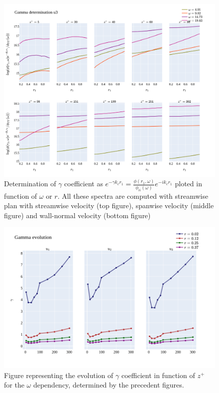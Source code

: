 \documentclass[]{article}
\theoremstyle{plain}
\theoremstyle{remark}
\begin{document}
\begin{figure}[H]
	\begin{center}
		\includegraphics[width=\textwidth]{../../output/figures/channel_wrles_retau395/split_time/gamma/gamma_u3_r_all.png}
		\caption{Determination of $\gamma$ coefficient as $e^{-\gamma k_c r_1} = \frac{\phi(r_1,\omega)}{\phi_{ii}(\omega)}e^{-ik_cr_1}$ ploted in function of $\omega$ or $r$. All these spectra are computed with streamwise plan with streamwise velocity (top figure), spanwise velocity (middle figure) and wall-normal velocity (bottom figure)}
	\end{center}
\end{figure}

\begin{figure}[H]
	\begin{center}
		\includegraphics[width=\textwidth]{../../output/figures/channel_wrles_retau395/split_time/gamma/gamma_view_w_all.png}
		\caption{Figure representing the evolution of $\gamma$ coefficient in function of $z^+$ for the $\omega$ dependency, determined by the precedent figures. }
	\end{center}
\end{figure}
\end{document}
